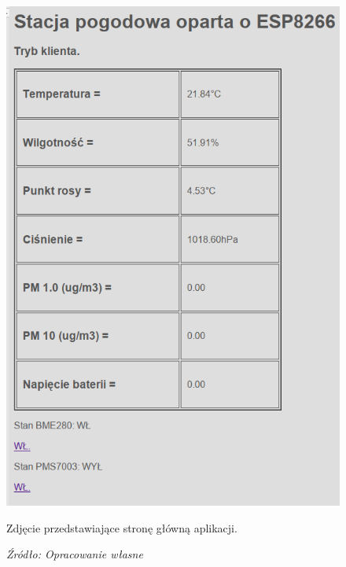 \documentclass[12pt,a4paper,oneside]{memoir}
\begin{document}
\begin{figure} [!h]
	\centering
	\includegraphics[scale=0.3]{images/app01.png}
	{\tytulyrozdzialow \footnotesize \caption[Aplikacja - strona główna] {Zdjęcie przedstawiające stronę główną aplikacji.}}
	\caption*{\textit{Źródło: Opracowanie własne}}
\end{figure}
\newpage
\end{document}
